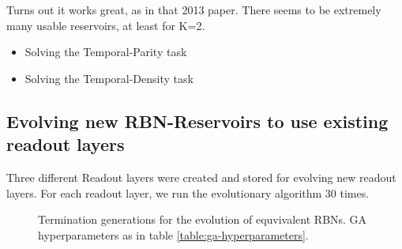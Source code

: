 Turns out it works great, as in that 2013 paper.
There seems to be extremely many usable reservoirs, at least for K=2.

\begin{itemize}
  \item Solving the Temporal-Parity task
  \item Solving the Temporal-Density task
\end{itemize}

\subsection{Evolving new RBN-Reservoirs to use existing readout layers}

Three different Readout layers were created and stored for evolving new readout layers.
For each readout layer, we run the evolutionary algorithm 30 times.


\begin{figure}
  \centering
  \caption{Termination generations for the evolution of equvivalent RBNs.
           GA hyperparameters as in table \ref{table:ga-hyperparameters}.}
\end{figure}


